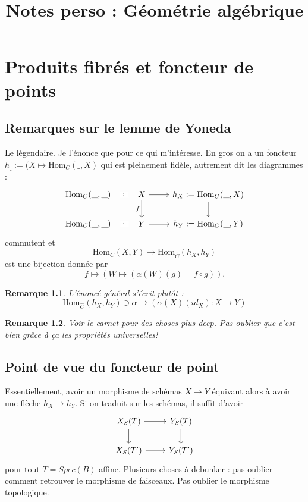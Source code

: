 \documentclass[a4paper,12pt]{book}
\title{Notes perso : Géométrie algébrique}
\date{}
\newcommand{\Hom}{\textrm{Hom}}
\theoremstyle{plain}
\newtheorem{rem}{Remarque}
\theoremstyle{definition}
\theoremstyle{remark}
\begin{document}
\maketitle
\tableofcontents


\chapter{Produits fibrés et foncteur de points}
\section{Remarques sur le lemme de Yoneda}
Le légendaire. Je l'énonce que pour ce qui m'intéresse.
En gros on a un foncteur $h_{\_}:=(X\mapsto \Hom_C(\_,X)$
qui est pleinement fidèle, autrement dit les diagrammes :
\[\begin{tikzcd}
	{\Hom_{C}(\_,\_)} & X & {h_X:=\Hom_C(\_,X)} \\
	{\Hom_{C}(\_,\_)} & Y & {h_Y:=\Hom_C(\_,Y)}
	\arrow["\colon"{description}, draw=none, from=1-1, to=1-2]
	\arrow[from=1-2, to=1-3]
	\arrow["f"', from=1-2, to=2-2]
	\arrow[from=1-3, to=2-3]
	\arrow["\colon"{description}, draw=none, from=2-1, to=2-2]
	\arrow[from=2-2, to=2-3]
\end{tikzcd}\]
commutent et 
\[\Hom_C(X,Y)\to \Hom_{\widehat C}(h_X,h_Y)\]
est une bijection donnée par 
\[f\mapsto (W\mapsto (\alpha(W)(g)=f\circ g)).\]
\begin{rem}
  L'énoncé général s'écrit plutôt :
  \[\Hom_{\widehat C}(h_X,h_Y)\ni \alpha\mapsto (\alpha(X)(id_X)\colon X\to Y)\]
\end{rem}
\begin{rem}
  Voir le carnet pour des choses plus deep. Pas oublier
  que c'est bien grâce à ça les propriétés universelles!
\end{rem}
\section{Point de vue du foncteur de point}
Essentiellement, avoir un morphisme de schémas
$X\to Y$ équivaut alors à avoir une flèche 
$h_X\to h_Y$. Si on traduit sur les schémas, il 
suffit d'avoir 
\[\begin{tikzcd}
	{X_S(T)} & {Y_S(T)} \\
	{X_S(T')} & {Y_S(T')}
	\arrow[from=1-1, to=1-2]
	\arrow[from=1-1, to=2-1]
	\arrow[from=1-2, to=2-2]
	\arrow[from=2-1, to=2-2]
\end{tikzcd}\]
pour tout $T=Spec(B)$ affine. Plusieurs
choses à debunker : pas oublier comment retrouver le morphisme
de faisceaux. Pas oublier le morphisme topologique.
\end{document}
